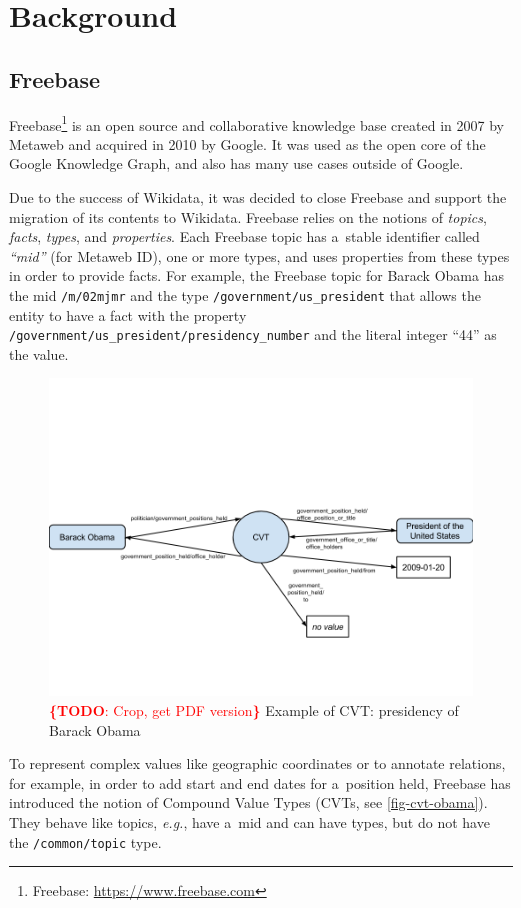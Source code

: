 \documentclass{sig-alternate}
\newcommand{\todo}[1]{\noindent\textcolor{red}{{\bf \{TODO}: #1{\bf \}}}}
\begin{document}
\section{Background}\label{sec:background}

\subsection{Freebase}

Freebase\footnote{Freebase: \url{https://www.freebase.com}} is an open source and
collaborative knowledge base created in 2007 by Metaweb and acquired in 2010 by Google.
It was used as the open core of the Google Knowledge Graph,
and also has many use cases outside of Google.

Due to the success of Wikidata,
it was decided to close Freebase and support the migration of its contents to Wikidata.
Freebase relies on the notions of \emph{topics}, \emph{facts}, \emph{types}, and \emph{properties}.
Each Freebase topic has a~stable identifier called \emph{``mid''} (for Metaweb ID),
one or more types, and uses properties from these types in order to provide facts.
For example, the Freebase topic for Barack Obama has the mid \texttt{/m/02mjmr}
and the type \texttt{/government/us\_president} that allows the entity to have
a fact with the property \texttt{/government/us\_president/presidency\_number}
and the literal integer ``44'' as the value.

\begin{figure}[!htbp]
\centering
\includegraphics[width=8.45 cm]{img/freebase-cvt-obama.png}
\caption{\todo{Crop, get PDF version} Example of CVT: presidency of Barack Obama}
\label{fig-cvt-obama}
\end{figure}

To represent complex values like geographic coordinates or to annotate relations,
for example, in order to add start and end dates for a~position held,
Freebase has introduced the notion of Compound Value Types (CVTs, see \autoref{fig-cvt-obama}).
They behave like topics, \emph{e.g.}, have a~mid and can have types,
but do not have the \texttt{/common/topic} type.
\end{document}
